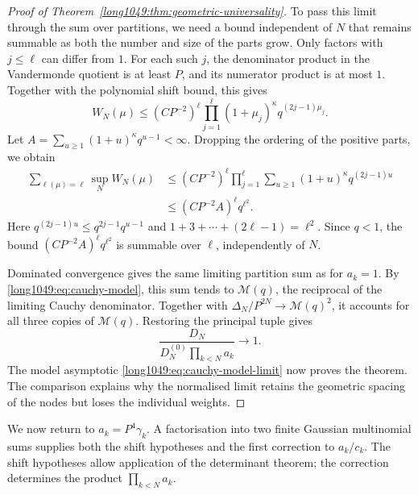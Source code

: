 \begin{proof}[Proof of Theorem~\ref{long1049:thm:geometric-universality}]
To pass this limit through the sum over partitions, we need a bound
independent of $N$ that remains summable as both the number and size
of the parts grow. Only factors with $j\le\ell$ can differ from $1$.
For each such $j$, the denominator product in the Vandermonde
quotient is at least $P$, and its numerator product is at most $1$.
Together with the polynomial shift bound, this gives
\[
 W_N(\mu)\le(CP^{-2})^\ell
 \prod_{j=1}^\ell(1+\mu_j)^\kappa q^{(2j-1)\mu_j}.
\]
Let $A=\sum_{u\ge1}(1+u)^\kappa q^{u-1}<\infty$.
Dropping the ordering of the positive parts, we obtain
\begin{align*}
 \sum_{\ell(\mu)=\ell}\sup_N W_N(\mu)
 &\le(CP^{-2})^\ell\prod_{j=1}^\ell
       \sum_{u\ge1}(1+u)^\kappa q^{(2j-1)u}\\
 &\le(CP^{-2}A)^\ell q^{\ell^2}.
\end{align*}
Here $q^{(2j-1)u}\le q^{2j-1}q^{u-1}$ and
$1+3+\cdots+(2\ell-1)=\ell^2$. Since $q<1$, the bound
$(CP^{-2}A)^\ell q^{\ell^2}$ is summable over $\ell$,
independently of $N$.

Dominated convergence gives the same limiting partition sum as
for $a_k=1$. By \eqref{long1049:eq:cauchy-model}, this sum tends
to $\mathcal M(q)$, the reciprocal of the limiting Cauchy
denominator. Together with $\Delta_N/P^{2N}\to\mathcal M(q)^2$,
it accounts for all three copies of $\mathcal M(q)$. Restoring
the principal tuple gives
\[
 \frac{D_N}{D_N^{(0)}\prod_{k<N}a_k}\longrightarrow1.
\]
The model asymptotic \eqref{long1049:eq:cauchy-model-limit} now proves
the theorem. The comparison explains why the normalised limit
retains the geometric spacing of the nodes but loses the individual
weights.
\end{proof}

We now return to $a_k=P^4\gamma_k$. A factorisation into two
finite Gaussian multinomial sums supplies both the shift hypotheses
and the first correction to $a_k/c_k$. The shift hypotheses allow
application of the determinant theorem; the correction determines
the product $\prod_{k<N}a_k$.

